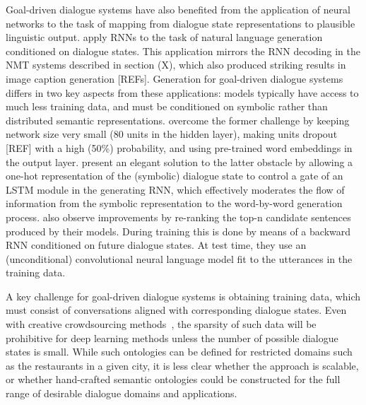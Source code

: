 \documentclass[11pt,letterpaper]{article}
\begin{document}
Goal-driven dialogue systems have also benefited from the application of neural networks to the task of mapping from dialogue state representations to plausible linguistic output.  apply RNNs to the task of natural language generation conditioned on dialogue states. This application mirrors the RNN decoding in the NMT systems described in section (X), which also produced striking results in image caption generation [REFs]. Generation for goal-driven dialogue systems differs in two key aspects from these applications: models typically have access to much less training data, and must be conditioned on symbolic rather than distributed semantic representations.  overcome the former challenge by keeping network size very small (80 units in the hidden layer), making units dropout [REF] with a high (50\%) probability, and using pre-trained word embeddings in the output layer.  present an elegant solution to the latter obstacle by allowing a one-hot representation of the (symbolic) dialogue state to control a gate of an LSTM module in the generating RNN, which effectively moderates the flow of information from the symbolic representation to the word-by-word generation process.  also observe improvements by re-ranking the top-n candidate sentences produced by their models. During training this is done by means of a backward RNN conditioned on future dialogue states. At test time, they use an (unconditional) convolutional neural language model fit to the utterances in the training data. 

A key challenge for goal-driven dialogue systems is obtaining training data, which must consist of conversations aligned with corresponding dialogue states. Even with creative crowdsourcing methods~\cite{wen2016network}, the sparsity of such data will be prohibitive for deep learning methods unless the number of possible dialogue states is small. While such ontologies can be defined for restricted domains such as the restaurants in a given city, it is less clear whether the approach is scalable, or whether hand-crafted semantic ontologies could be constructed for the full range of desirable dialogue domains and applications. 

\end{document}
